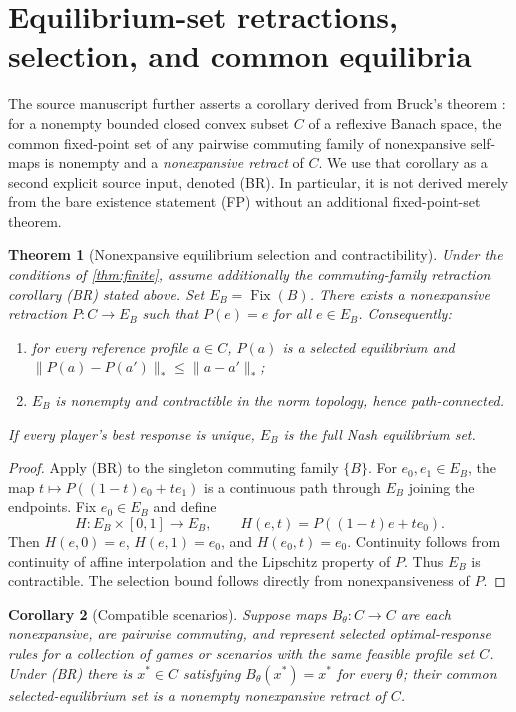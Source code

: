 \documentclass[11pt]{article}
\newtheorem{theorem}{Theorem}[section]
\newtheorem{corollary}[theorem]{Corollary}
\theoremstyle{definition}\newtheorem{definition}[theorem]{Definition}
\newcommand{\Fix}{\operatorname{Fix}}
\begin{document}
\section{Equilibrium-set retractions, selection, and common equilibria}
The source manuscript further asserts a corollary derived from Bruck's theorem \cite{OAIFP,Bruck1974}: for a nonempty bounded closed convex subset $C$ of a reflexive Banach space, the common fixed-point set of any pairwise commuting family of nonexpansive self-maps is nonempty and a \emph{nonexpansive retract} of $C$. We use that corollary as a second explicit source input, denoted (BR). In particular, it is not derived merely from the bare existence statement (FP) without an additional fixed-point-set theorem.
\begin{theorem}[Nonexpansive equilibrium selection and contractibility\label{thm:retraction}]
Under the conditions of \cref{thm:finite}, assume additionally the commuting-family retraction corollary (BR) stated above. Set $E_B=\Fix(B)$. There exists a nonexpansive retraction $P:C\to E_B$ such that $P(e)=e$ for all $e\in E_B$. Consequently:
\begin{enumerate}[label=(\alph*)]
\item for every reference profile $a\in C$, $P(a)$ is a selected equilibrium and $\|P(a)-P(a')\|_*\le\|a-a'\|_*$;
\item $E_B$ is nonempty and contractible in the norm topology, hence path-connected.
\end{enumerate}
If every player's best response is unique, $E_B$ is the full Nash equilibrium set.
\end{theorem}
\begin{proof}
Apply (BR) to the singleton commuting family $\{B\}$. For $e_0,e_1\in E_B$, the map $t\mapsto P((1-t)e_0+te_1)$ is a continuous path through $E_B$ joining the endpoints. Fix $e_0\in E_B$ and define
\[H:E_B\times[0,1]\to E_B,\qquad H(e,t)=P((1-t)e+te_0).\]
Then $H(e,0)=e$, $H(e,1)=e_0$, and $H(e_0,t)=e_0$. Continuity follows from continuity of affine interpolation and the Lipschitz property of $P$. Thus $E_B$ is contractible. The selection bound follows directly from nonexpansiveness of $P$.
\end{proof}
\begin{corollary}[Compatible scenarios\label{cor:commuting}]
Suppose maps $B_\theta:C\to C$ are each nonexpansive, are pairwise commuting, and represent selected optimal-response rules for a collection of games or scenarios with the same feasible profile set $C$. Under (BR) there is $x^*\in C$ satisfying $B_\theta(x^*)=x^*$ for every $\theta$; their common selected-equilibrium set is a nonempty nonexpansive retract of $C$.
\end{corollary}
\end{document}
